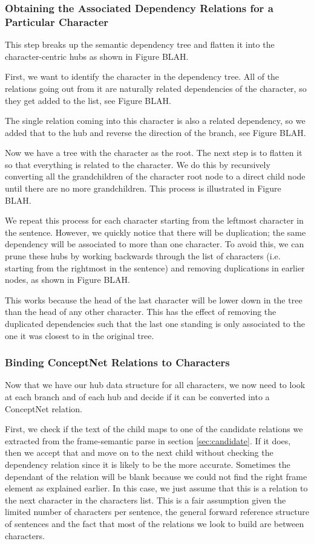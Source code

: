 \subsubsection{Obtaining the Associated Dependency Relations for a Particular Character}

This step breaks up the semantic dependency tree and flatten it into the character-centric hubs as shown in Figure BLAH.

First, we want to identify the character in the dependency tree. All of the relations going out from it are naturally related dependencies of the character, so they get added to the list, see Figure BLAH.

The single relation coming into this character is also a related dependency, so we added that to the hub and reverse the direction of the branch, see Figure BLAH.

Now we have a tree with the character as the root. The next step is to flatten it so that everything is related to the character. We do this by recursively converting all the grandchildren of the character root node to a direct child node until there are no more grandchildren. This process is illustrated in Figure BLAH.

We repeat this process for each character starting from the leftmost character in the sentence. However, we quickly notice that there will be duplication; the same dependency will be associated to more than one character. To avoid this, we can prune these hubs by working backwards through the list of characters (i.e. starting from the rightmost in the sentence) and removing duplications in earlier nodes, as shown in Figure BLAH. 

This works because the head of the last character will be lower down in the tree than the head of any other character. This has the effect of removing the duplicated dependencies such that the last one standing is only associated to the one it was closest to in the original tree.


\subsubsection{Binding ConceptNet Relations to Characters}
	
Now that we have our hub data structure for all characters, we now need to look at each branch and of each hub and decide if it can be converted into a ConceptNet relation.

First, we check if the text of the child maps to one of the candidate relations we extracted from the frame-semantic parse in section \ref{sec:candidate}. If it does, then we accept that and move on to the next child without checking the dependency relation since it is likely to be the more accurate. Sometimes the dependant of the relation will be blank because we could not find the right frame element as explained earlier. In this case, we just assume that this is a relation to the next character in the characters list. This is a fair assumption given the limited number of characters per sentence, the general forward reference structure of sentences and the fact that most of the relations we look to build are between characters.

